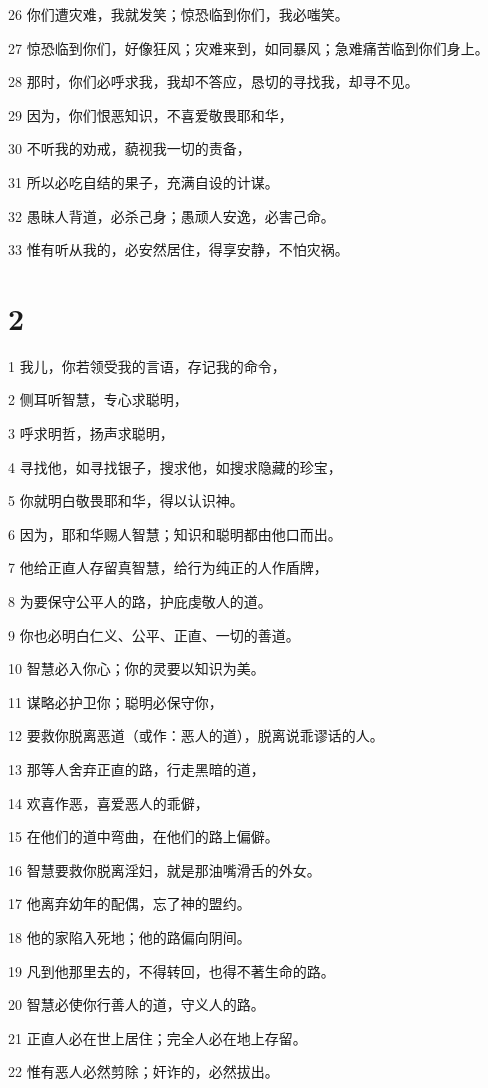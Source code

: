 \par 26 你们遭灾难，我就发笑；惊恐临到你们，我必嗤笑。
\par 27 惊恐临到你们，好像狂风；灾难来到，如同暴风；急难痛苦临到你们身上。
\par 28 那时，你们必呼求我，我却不答应，恳切的寻找我，却寻不见。
\par 29 因为，你们恨恶知识，不喜爱敬畏耶和华，
\par 30 不听我的劝戒，藐视我一切的责备，
\par 31 所以必吃自结的果子，充满自设的计谋。
\par 32 愚昧人背道，必杀己身；愚顽人安逸，必害己命。
\par 33 惟有听从我的，必安然居住，得享安静，不怕灾祸。

\chapter{2}

\par 1 我儿，你若领受我的言语，存记我的命令，
\par 2 侧耳听智慧，专心求聪明，
\par 3 呼求明哲，扬声求聪明，
\par 4 寻找他，如寻找银子，搜求他，如搜求隐藏的珍宝，
\par 5 你就明白敬畏耶和华，得以认识神。
\par 6 因为，耶和华赐人智慧；知识和聪明都由他口而出。
\par 7 他给正直人存留真智慧，给行为纯正的人作盾牌，
\par 8 为要保守公平人的路，护庇虔敬人的道。
\par 9 你也必明白仁义、公平、正直、一切的善道。
\par 10 智慧必入你心；你的灵要以知识为美。
\par 11 谋略必护卫你；聪明必保守你，
\par 12 要救你脱离恶道（或作：恶人的道），脱离说乖谬话的人。
\par 13 那等人舍弃正直的路，行走黑暗的道，
\par 14 欢喜作恶，喜爱恶人的乖僻，
\par 15 在他们的道中弯曲，在他们的路上偏僻。
\par 16 智慧要救你脱离淫妇，就是那油嘴滑舌的外女。
\par 17 他离弃幼年的配偶，忘了神的盟约。
\par 18 他的家陷入死地；他的路偏向阴间。
\par 19 凡到他那里去的，不得转回，也得不著生命的路。
\par 20 智慧必使你行善人的道，守义人的路。
\par 21 正直人必在世上居住；完全人必在地上存留。
\par 22 惟有恶人必然剪除；奸诈的，必然拔出。

